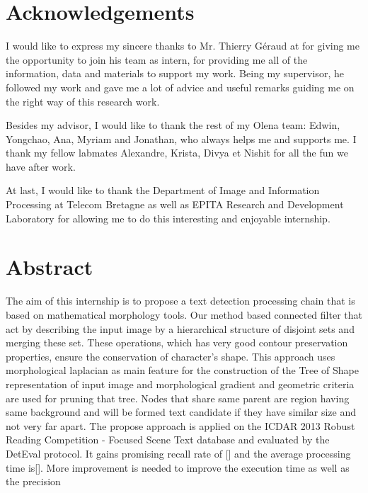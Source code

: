 \graphicspath{ {0TitlePage/title/} }
\section{Acknowledgements}
I would like to express my sincere thanks to Mr. Thierry Géraud at for giving me the opportunity to join his team as intern, for providing me all of the information, data and materials to support my work. Being my supervisor, he followed my work and gave me a lot of advice and useful remarks guiding me on the right way of this research work.

Besides my advisor, I would like to thank the rest of my Olena team: Edwin, Yongchao, Ana, Myriam and Jonathan, who always helps me and supports me. I thank my fellow labmates Alexandre, Krista, Divya et Nishit for all the fun we have after work.

At last, I would like to thank the Department of Image and Information Processing at Telecom Bretagne as well as EPITA Research and Development Laboratory for allowing me to do this interesting and enjoyable internship. 

\section{Abstract}
The aim of this internship is to propose a text detection processing chain that is based on mathematical morphology tools. Our method based connected filter that act by describing the input image by a hierarchical structure of disjoint sets and merging these set. These operations, which has very good contour preservation properties, ensure the conservation of character's shape. This approach uses morphological laplacian as main feature for the construction of the Tree of Shape representation of input image and morphological gradient and geometric criteria are used for pruning that tree. Nodes that share same parent are region having same background and will be formed text candidate if they have similar size and not very far apart. The propose approach is applied on the ICDAR 2013 Robust Reading Competition - Focused Scene Text database and evaluated by the DetEval protocol. It gains promising recall rate of [] and the average processing time is[]. More improvement is needed to improve the execution time as well as the precision

